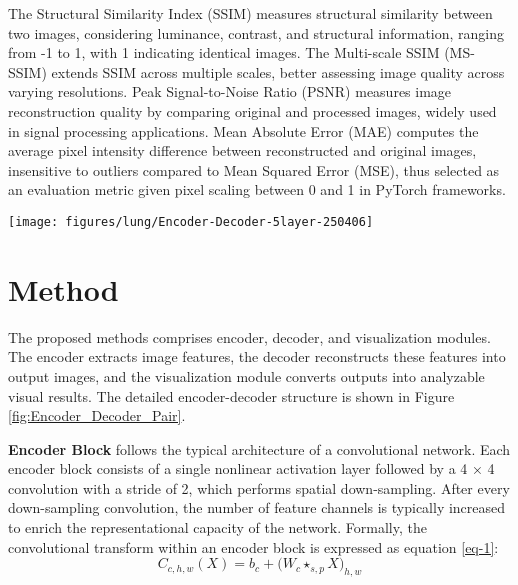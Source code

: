 \documentclass[a4paper, times, 10pt,twocolumn]{article}
\begin{document}
The Structural Similarity Index \cite{zhou_wang_image_2004} (SSIM) measures structural similarity between two images, considering luminance, contrast, and structural information, ranging from -1 to 1, with 1 indicating identical images. The Multi-scale SSIM (MS-SSIM) extends SSIM across multiple scales, better assessing image quality across varying resolutions. Peak Signal-to-Noise Ratio \cite{hore_image_2010} (PSNR) measures image reconstruction quality by comparing original and processed images, widely used in signal processing applications. Mean Absolute Error\cite{chai_root_2014} (MAE) computes the average pixel intensity difference between reconstructed and original images, insensitive to outliers compared to Mean Squared Error (MSE), thus selected as an evaluation metric given pixel scaling between 0 and 1 in PyTorch frameworks.
\begin{figure*}[t!]
	\centering
	\texttt{[image: figures/lung/Encoder-Decoder-5layer-250406]}
	\caption[architecture]{Schematic Diagram of Data Flow Within the Model. The PET image is shown on the left, and the CT image on the right. The blue modules correspond to the encoder architecture, while the orange modules represent the decoder architecture. The upper portion of the figure illustrates the fundamental structures of the encoder blocks, decoder blocks, and visualization blocks. The connections in the lower portion indicate the skip connections.}
	\label{fig:Encoder_Decoder_Pair}
\end{figure*}

\section{Method}
The proposed methods comprises encoder, decoder, and visualization modules. The encoder extracts image features, the decoder reconstructs these features into output images, and the visualization module converts outputs into analyzable visual results. The detailed encoder-decoder structure is shown in Figure \ref{fig:Encoder_Decoder_Pair}.

\textbf{Encoder Block} follows the typical architecture of a convolutional network.
Each encoder block consists of a single nonlinear activation layer followed by a 4 × 4 convolution with a stride of 2, which performs spatial down-sampling. After every down-sampling convolution, the number of feature channels is typically increased to enrich the representational capacity of the network. Formally, the convolutional transform within an encoder block is expressed as equation \eqref{eq-1}:
\begin{equation}
	\label{eq-1}
	C_{c,h,w}(X)= b_{c} + \bigl(W_{c} \star_{s,p} X\bigr)_{h,w}
\end{equation}
\end{document}
